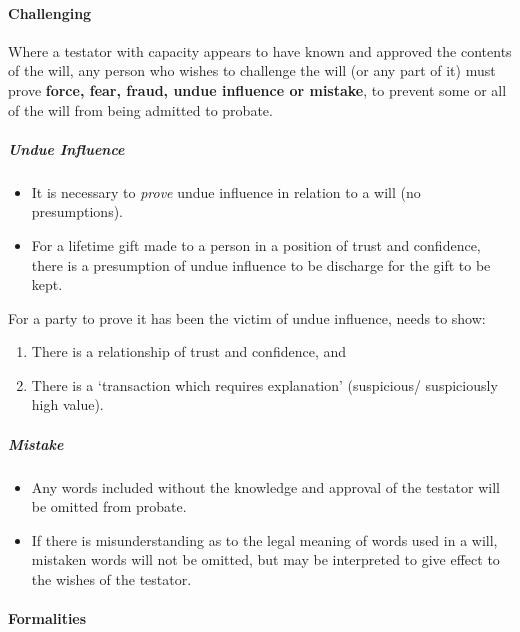 \documentclass[
]{article}
\providecommand{\tightlist}{%
  \setlength{\itemsep}{0pt}\setlength{\parskip}{0pt}}
\begin{document}
\hypertarget{challenging}{%
\paragraph{Challenging}\label{challenging}}

Where a testator with capacity appears to have known and approved the
contents of the will, any person who wishes to challenge the will (or
any part of it) must prove \textbf{force, fear, fraud, undue influence
or mistake}, to prevent some or all of the will from being admitted to
probate.

\hypertarget{undue-influence}{%
\subparagraph{Undue Influence}\label{undue-influence}}

\begin{itemize}
\tightlist
\item
  It is necessary to \emph{prove} undue influence in relation to a will
  (no presumptions).
\item
  For a lifetime gift made to a person in a position of trust and
  confidence, there is a presumption of undue influence to be discharge
  for the gift to be kept.
\end{itemize}

For a party to prove it has been the victim of undue influence, needs to
show:

\begin{enumerate}
\def\labelenumi{\arabic{enumi}.}
\tightlist
\item
  There is a relationship of trust and confidence, and
\item
  There is a `transaction which requires explanation' (suspicious/
  suspiciously high value).
\end{enumerate}

\hypertarget{mistake}{%
\subparagraph{Mistake}\label{mistake}}

\begin{itemize}
\tightlist
\item
  Any words included without the knowledge and approval of the testator
  will be omitted from probate.
\item
  If there is misunderstanding as to the legal meaning of words used in
  a will, mistaken words will not be omitted, but may be interpreted to
  give effect to the wishes of the testator.
\end{itemize}

\hypertarget{formalities}{%
\paragraph{Formalities}\label{formalities}}
\end{document}
